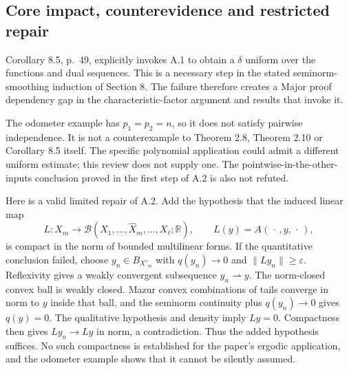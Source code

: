 \documentclass[10pt]{article}
\begin{document}
\subsection*{Core impact, counterevidence and restricted repair}
Corollary 8.5, p. 49, explicitly invokes A.1 to obtain a \(\delta\) uniform over the functions and dual sequences. This is a necessary step in the stated seminorm-smoothing induction of Section 8. The failure therefore creates a Major proof dependency gap in the characteristic-factor argument and results that invoke it.\par
The odometer example has \(p_1=p_2=n\), so it does not satisfy pairwise independence. It is not a counterexample to Theorem 2.8, Theorem 2.10 or Corollary 8.5 itself. The specific polynomial application could admit a different uniform estimate; this review does not supply one. The pointwise-in-the-other-inputs conclusion proved in the first step of A.2 is also not refuted.\par
Here is a valid limited repair of A.2. Add the hypothesis that the induced linear map \[L:X_m\longrightarrow
 \mathcal B(X_1,\ldots,\widehat X_m,\ldots,X_\ell;\mathbb R),
 \qquad L(y)=A(\,\cdot\,,y,\,\cdot\,),\] is compact in the norm of bounded multilinear forms. If the quantitative conclusion failed, choose \(y_n\in B_{X'_m}\) with \(q(y_n)\to0\) and \(\|Ly_n\|\ge\varepsilon\). Reflexivity gives a weakly convergent subsequence \(y_n\rightharpoonup y\). The norm-closed convex ball is weakly closed. Mazur convex combinations of tails converge in norm to \(y\) inside that ball, and the seminorm continuity plus \(q(y_n)\to0\) gives \(q(y)=0\). The qualitative hypothesis and density imply \(Ly=0\). Compactness then gives \(Ly_n\to Ly\) in norm, a contradiction. Thus the added hypothesis suffices. No such compactness is established for the paper’s ergodic application, and the odometer example shows that it cannot be silently assumed.\par
\end{document}
